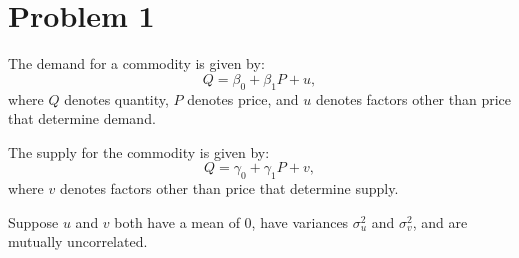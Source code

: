 \documentclass[11pt]{article}
\begin{document}
	

	\psetheader
\section*{Problem 1}

The demand for a commodity is given by:
\[
Q = \beta_0 + \beta_1 P + u,
\]
where \( Q \) denotes quantity, \( P \) denotes price, and \( u \) denotes factors other than price that determine demand.

The supply for the commodity is given by:
\[
Q = \gamma_0 + \gamma_1 P + v,
\]
where \( v \) denotes factors other than price that determine supply.

Suppose \( u \) and \( v \) both have a mean of 0, have variances \( \sigma_u^2 \) and \( \sigma_v^2 \), and are mutually uncorrelated.
\end{document}
